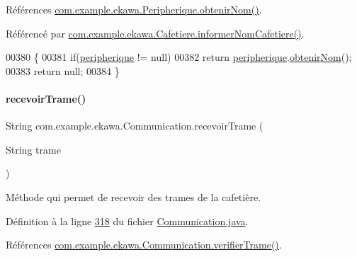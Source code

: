 Références \hyperlink{_peripherique_8java_source_l00244}{com.\+example.\+ekawa.\+Peripherique.\+obtenir\+Nom()}.



Référencé par \hyperlink{_cafetiere_8java_source_l00336}{com.\+example.\+ekawa.\+Cafetiere.\+informer\+Nom\+Cafetiere()}.


\begin{DoxyCode}
00380     \{
00381         \textcolor{keywordflow}{if}(\hyperlink{classcom_1_1example_1_1ekawa_1_1_communication_a59a25b4807148701560e4341f79c0c16}{peripherique} != null)
00382             \textcolor{keywordflow}{return} \hyperlink{classcom_1_1example_1_1ekawa_1_1_communication_a59a25b4807148701560e4341f79c0c16}{peripherique}.\hyperlink{classcom_1_1example_1_1ekawa_1_1_peripherique_ad54cfafe03dfcf18cbd9b20602c4d86e}{obtenirNom}();
00383         \textcolor{keywordflow}{return} null;
00384     \}
\end{DoxyCode}
\mbox{\label{classcom_1_1example_1_1ekawa_1_1_communication_a0ca98776b3fe48fa76e134607edb7871}} 
\paragraph{\texorpdfstring{recevoir\+Trame()}{recevoirTrame()}}
{\footnotesize\ttfamily String com.\+example.\+ekawa.\+Communication.\+recevoir\+Trame (\begin{DoxyParamCaption}\item[{String}]{trame }\end{DoxyParamCaption})}



Méthode qui permet de recevoir des trames de la cafetière. 



Définition à la ligne \hyperlink{_communication_8java_source_l00318}{318} du fichier \hyperlink{_communication_8java_source}{Communication.\+java}.



Références \hyperlink{_communication_8java_source_l00329}{com.\+example.\+ekawa.\+Communication.\+verifier\+Trame()}.


